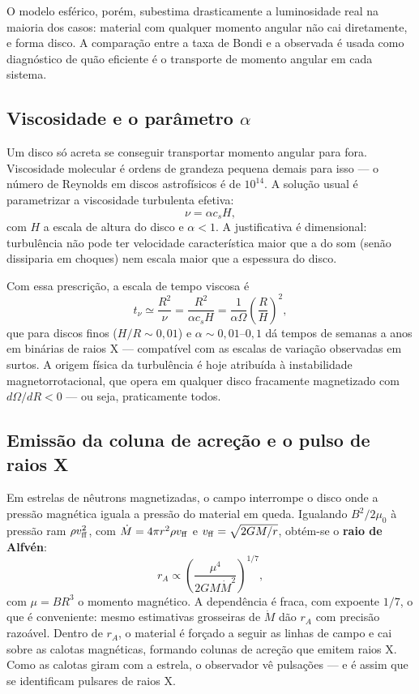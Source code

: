 \documentclass[11pt,a4paper]{article}
\begin{document}
O modelo esférico, porém, subestima drasticamente a luminosidade real na maioria dos casos: material com qualquer momento angular não cai diretamente, e forma disco. A comparação entre a taxa de Bondi e a observada é usada como diagnóstico de quão eficiente é o transporte de momento angular em cada sistema.

\subsection*{Viscosidade e o parâmetro $\alpha$}

Um disco só acreta se conseguir transportar momento angular para fora. Viscosidade molecular é ordens de grandeza pequena demais para isso --- o número de Reynolds em discos astrofísicos é de $10^{14}$. A solução usual é parametrizar a viscosidade turbulenta efetiva:
\[
\nu=\alpha c_sH,
\]
com $H$ a escala de altura do disco e $\alpha<1$. A justificativa é dimensional: turbulência não pode ter velocidade característica maior que a do som (senão dissiparia em choques) nem escala maior que a espessura do disco.

Com essa prescrição, a escala de tempo viscosa é
\[
t_\nu\simeq\frac{R^{2}}{\nu}=\frac{R^{2}}{\alpha c_sH}=\frac{1}{\alpha\Omega}\left(\frac{R}{H}\right)^{2},
\]
que para discos finos ($H/R\sim0{,}01$) e $\alpha\sim0{,}01$--$0{,}1$ dá tempos de semanas a anos em binárias de raios X --- compatível com as escalas de variação observadas em surtos. A origem física da turbulência é hoje atribuída à instabilidade magnetorrotacional, que opera em qualquer disco fracamente magnetizado com $d\Omega/dR<0$ --- ou seja, praticamente todos.

\subsection*{Emissão da coluna de acreção e o pulso de raios X}

Em estrelas de nêutrons magnetizadas, o campo interrompe o disco onde a pressão magnética iguala a pressão do material em queda. Igualando $B^{2}/2\mu_0$ à pressão ram $\rho v_{\rm ff}^{2}$, com $\dot{M}=4\pi r^{2}\rho v_{\rm ff}$ e $v_{\rm ff}=\sqrt{2GM/r}$, obtém-se o \textbf{raio de Alfvén}:
\[
r_A\propto\left(\frac{\mu^{4}}{2GM\dot{M}^{2}}\right)^{1/7},
\]
com $\mu=BR^{3}$ o momento magnético. A dependência é fraca, com expoente $1/7$, o que é conveniente: mesmo estimativas grosseiras de $\dot{M}$ dão $r_A$ com precisão razoável. Dentro de $r_A$, o material é forçado a seguir as linhas de campo e cai sobre as calotas magnéticas, formando colunas de acreção que emitem raios X. Como as calotas giram com a estrela, o observador vê pulsações --- e é assim que se identificam pulsares de raios X.
\end{document}
